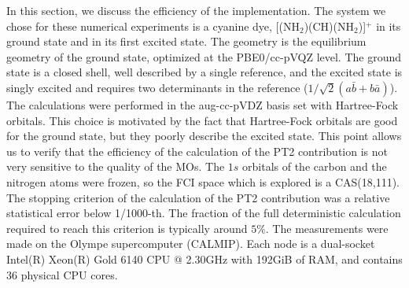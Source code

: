 \documentclass[./thesis.tex]{subfiles}
\begin{document}
In this section, we discuss the efficiency of the implementation. The system
we chose for these numerical experiments is a cyanine dye,
[(NH$_2$)(CH)(NH$_2$)]$^+$ in its ground state and in its first excited state.
The geometry is the equilibrium geometry of the ground state, optimized at the
PBE0/cc-pVQZ level.  The ground state is a closed shell, well described by a
single reference, and the excited state is singly excited and requires two
determinants in the reference ($1/\sqrt{2} (a\bar{b} + b\bar{a})$).
The calculations were performed in the aug-cc-pVDZ basis set with Hartree-Fock
orbitals. This choice is motivated by the fact that Hartree-Fock orbitals
are good for the ground state, but they poorly describe the excited state.
This point allows us to verify that the efficiency of the calculation of the
PT2 contribution is not very sensitive to the quality of the MOs.
The $1s$ orbitals of the carbon and the nitrogen atoms were frozen, so
the FCI space which is explored is a CAS(18,111). 
The stopping criterion of the calculation of the PT2 contribution was a
relative statistical error below 1/1000-th.
The fraction of the full deterministic calculation required to reach this criterion
is typically around $5\%$.
The measurements were made on the Olympe supercomputer (CALMIP). Each node is 
a dual-socket Intel(R) Xeon(R) Gold 6140 CPU @ 2.30GHz with 192GiB of RAM, and
contains 36 physical CPU cores.
\end{document}
